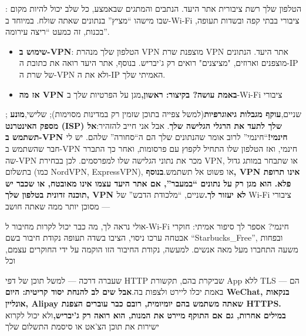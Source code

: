 


: הטלפון שלך רשת ציבורית אתר היעד. הנתבים והמתגים שבאמצע, כל שלב יכול להיות מקום שבו מישהו “מציץ” בנתונים שאתה שולח. במיוחד ב-Wi-Fi ציבורי בבתי קפה ובשדות תעופה, בכנות, זה כמעט “ריצה עירומה”.

\begin{itemize}
  \item \textbf{שימוש ב-VPN}: הטלפון שלך מנהרת VPN מוצפנת שרת VPN אתר היעד. הנתונים מוצפנים וארוזים, "מציצנים" רואים רק ג'יבריש. בנוסף, אתר היעד רואה את כתובת ה-IP של שרת ה-VPN ולא את ה-IP האמיתי שלך.
  \item \textbf{אז מה VPN באמת עושה? בקיצור: ראשון,}מגן על הפרטיות שלך ב-Wi-Fi ציבורי
\end{itemize}

; שניים,\textbf{עוקף מגבלות גיאוגרפיות}(למשל צפייה בתוכן שזמין רק במדינות מסוימות); שלישי,\textbf{מונע מספק האינטרנט (ISP) שלך לתעד את הרגלי הגלישה שלך}. אבל אני חייב להזהיר:\textbf{אל תשתמש ב-VPN חינמי!}“חינמי” לרוב אומר שהנתונים שלך הם ה“סחורה” שלהם. יש לי חבר שהשתמש ב-VPN חינמי, ואז הטלפון שלו התחיל לקפוץ עם פרסומות, ואחר כך התברר שה-VPN מכר את נתוני הגלישה שלו למפרסמים. לכן בבחירת VPN, או שתבחר במותג גדול בתשלום (כמו NordVPN, ExpressVPN), או פשוט אל תשתמש.\textbf{בנוסף, VPN אינו תרופת פלא. הוא מגן רק על נתונים “במעבר”, אם אתר היעד עצמו אינו מאובטח, או שכבר יש תוכנה זדונית בטלפון שלך, VPN לא יעזור לך.}שניים, “מלכודת הדבש” של Wi-Fi ציבורי — מסוכן יותר ממה שאתה חושב

אולי נראה לך, מה כבר יכול לקרות מחיבור ל-Wi-Fi חינמי? אספר לך סיפור אמיתי: חוקרי אבטחה ערכו ניסוי, הציבו בשדה תעופה נקודת חיבור בשם “Starbucks\_Free”, ובפחות משעה התחברו מעל מאה אנשים. למעשה, נקודת החיבור הזו הוקמה על ידי החוקרים עצמם, וכל


שעברה דרכה — למשל תוכן של דפי HTTP שביקרת בהם, תקשורת App ללא TLS — הם באמת יכלו ליירט ולצפות בה.\textbf{אבל שים לב להנחת יסוד קריטית: היום WeChat, בנקאות אונליין, Alipay שאתה משתמש בהם יומיומית, רובם כבר עוברים הצפנת HTTPS. במילים אחרות, גם אם התוקף מיירט את המנות, הוא רואה רק ג'יבריש,}ולא יכול לקרוא ישירות את תוכן הצ'אט או סיסמת התשלום שלך


